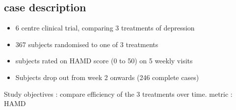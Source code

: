 \documentclass{beamer}
\begin{document}
\subsection{case description}
\begin{frame}
	\begin{itemize}
		\item<1->6 centre clinical trial, comparing 3 treatments of depression
		\item<2->367 subjects randomised to one of 3 treatments
		\item<3->subjects rated on HAMD score (0 to 50)  on 5 weekly visits
		\item<4-> Subjects drop out from week 2 onwards (246 complete cases)
	\end{itemize}
	Study objectives : compare efficiency of the 3 treatments over time. metric : HAMD
\end{frame}

\begin{frame}
\end{frame}

\begin{frame}
\end{frame}
\end{document}

